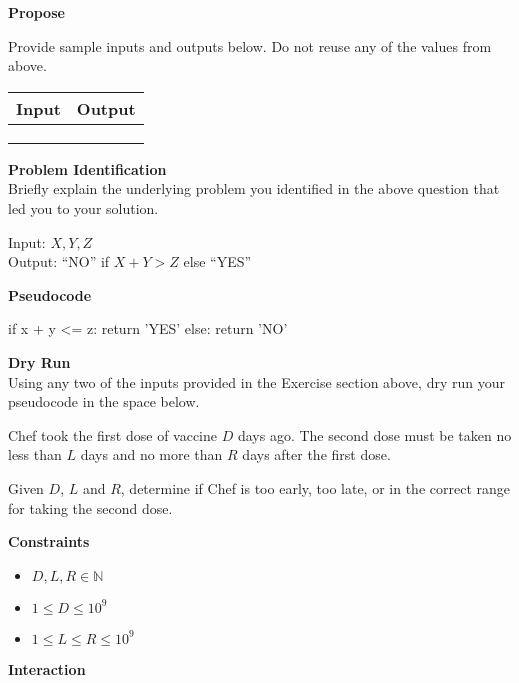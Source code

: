 \documentclass[a4paper]{exam}
\newcommand\heading[1]{\textbf{#1}}
\newcommand\inn{\in \mathbb{N}}
\begin{document}
\begin{questions}
    \heading{Propose}

    Provide sample inputs and outputs below. Do not reuse any of the values from above.

    \begin{tabularx}{\textwidth}{|X|X|}
        \rowcolor{gray!50}
        \hline
        Input & Output \\ \hline\hline
              &        \\\hline
              &        \\\hline
              &        \\\hline
    \end{tabularx}
    \heading{Problem Identification}\\
    Briefly explain the underlying problem you identified in the above question that led you to your solution.


  \begin{mdframed}
    Input: $X,Y,Z$\\
    Output: ``NO'' if $X+Y>Z$ else ``YES''
  \end{mdframed}

    \heading{Pseudocode}
\begin{python}
if x + y <= z:
    return 'YES'
else:
    return 'NO'
\end{python}
    

    \heading{Dry Run}\\
    Using any two of the inputs provided in the Exercise section above, dry run your pseudocode in the space below.
    \vspace*{100pt}


    Chef took the first dose of vaccine $D$ days ago. The second dose must be taken no less than $L$ days and no more than $R$ days after the first dose.

    Given $D$, $L$ and $R$, determine if Chef is too early, too late, or in the correct range for taking the second dose.



    \heading{Constraints}
    \begin{itemize}
        \item $D,L,R\inn$
        \item $1 \le D \le 10^9$
        \item $1 \le L \le R \le 10^9$
    \end{itemize}


    \heading{Interaction}


\end{questions}
\end{document}
